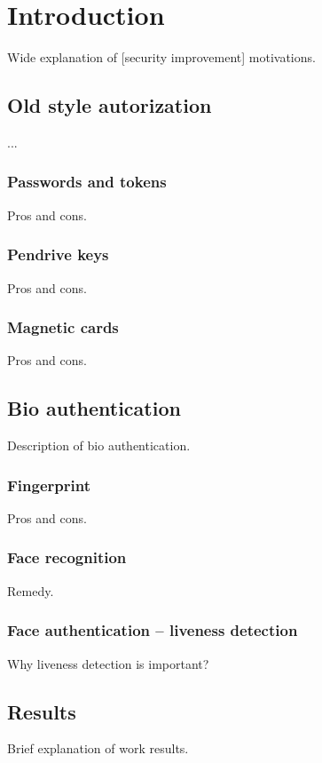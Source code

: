 \section{Introduction}
    Wide explanation of [security improvement] motivations.

    \subsection{Old style autorization}
        ...

        \subsubsection{Passwords and tokens}
            Pros and cons.

        \subsubsection{Pendrive keys}
            Pros and cons.

        \subsubsection{Magnetic cards}
            Pros and cons.

    \subsection{Bio authentication}
        Description of bio authentication.

        \subsubsection{Fingerprint}
            Pros and cons.

        \subsubsection{Face recognition}
            Remedy.

        \subsubsection{Face authentication -- liveness detection}
            Why liveness detection is important?

    \subsection{Results}
        Brief explanation of work results.
